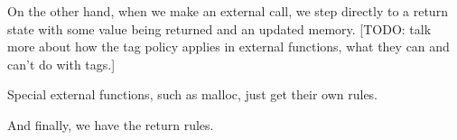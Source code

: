 \documentclass{llncs}
\begin{document}
\callstep

On the other hand, when we make an external call, we step directly to a return state with some value
being returned and an updated memory. [TODO: talk more about how the tag policy applies in external
  functions, what they can and can't do with tags.]

\extcallstep

Special external functions, such as malloc, just get their own rules.

\mallocstep

And finally, we have the return rules.

\returnstep
\retvalstep
\retnovalstep
\end{document}
